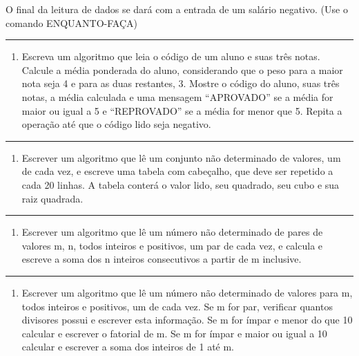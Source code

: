 \documentclass[12pt,a4paper]{article}
\renewcommand{\linethickness}{0.05em}
\providecommand{\tightlist}{%
      \setlength{\itemsep}{0pt}\setlength{\parskip}{0pt}}
\begin{document}
O final da leitura de dados se dará com a entrada de um salário
negativo. (Use o comando ENQUANTO-FAÇA)

    \begin{center}\rule{0.5\linewidth}{\linethickness}\end{center}

\begin{enumerate}
\def\labelenumi{\arabic{enumi}.}
\setcounter{enumi}{5}
\tightlist
\item
  Escreva um algoritmo que leia o código de um aluno e suas três notas.
  Calcule a média ponderada do aluno, considerando que o peso para a
  maior nota seja 4 e para as duas restantes, 3. Mostre o código do
  aluno, suas três notas, a média calculada e uma mensagem ``APROVADO''
  se a média for maior ou igual a 5 e ``REPROVADO'' se a média for menor
  que 5. Repita a operação até que o código lido seja negativo.
\end{enumerate}

    \begin{center}\rule{0.5\linewidth}{\linethickness}\end{center}

\begin{enumerate}
\def\labelenumi{\arabic{enumi}.}
\setcounter{enumi}{6}
\tightlist
\item
  Escrever um algoritmo que lê um conjunto não determinado de valores,
  um de cada vez, e escreve uma tabela com cabeçalho, que deve ser
  repetido a cada 20 linhas. A tabela conterá o valor lido, seu
  quadrado, seu cubo e sua raiz quadrada.
\end{enumerate}

    \begin{center}\rule{0.5\linewidth}{\linethickness}\end{center}

\begin{enumerate}
\def\labelenumi{\arabic{enumi}.}
\setcounter{enumi}{7}
\tightlist
\item
  Escrever um algoritmo que lê um número não determinado de pares de
  valores m, n, todos inteiros e positivos, um par de cada vez, e
  calcula e escreve a soma dos n inteiros consecutivos a partir de m
  inclusive.
\end{enumerate}

    \begin{center}\rule{0.5\linewidth}{\linethickness}\end{center}

\begin{enumerate}
\def\labelenumi{\arabic{enumi}.}
\setcounter{enumi}{8}
\tightlist
\item
  Escrever um algoritmo que lê um número não determinado de valores para
  m, todos inteiros e positivos, um de cada vez. Se m for par, verificar
  quantos divisores possui e escrever esta informação. Se m for ímpar e
  menor do que 10 calcular e escrever o fatorial de m. Se m for ímpar e
  maior ou igual a 10 calcular e escrever a soma dos inteiros de 1 até
  m.
\end{enumerate}
\end{document}

